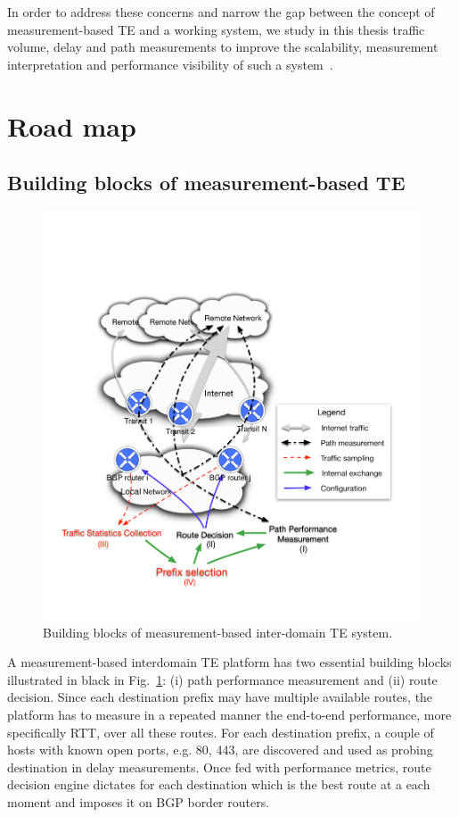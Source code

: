 In order to address these concerns and narrow the gap between the concept of measurement-based TE and a working system, we 
study in this thesis traffic volume, delay and path measurements to improve the scalability, measurement interpretation and performance visibility of such a system~\cite{b6}.


\section{Road map}
\subsection{Building blocks of measurement-based TE}

\begin{figure}[!htb]
\centering
\includegraphics[width=\textwidth]{gfx/chap1/archi.pdf}
\caption{Building blocks of measurement-based inter-domain TE system.}
\label{fig:archi}
\end{figure}

A measurement-based interdomain TE platform has two essential building blocks illustrated in black in Fig.~\ref{fig:archi}: (i) path performance measurement and (ii) route decision.
Since each destination prefix may have multiple available routes, the platform has to measure in a repeated manner the end-to-end performance, more specifically \ac{RTT}, over all these routes. 
For each destination prefix, a couple of hosts with known open ports, e.g. 80, 443, are discovered and used as probing destination in delay measurements.
Once fed with performance metrics, route decision engine dictates for each destination which is the best route at a each moment and imposes it on BGP border routers.


